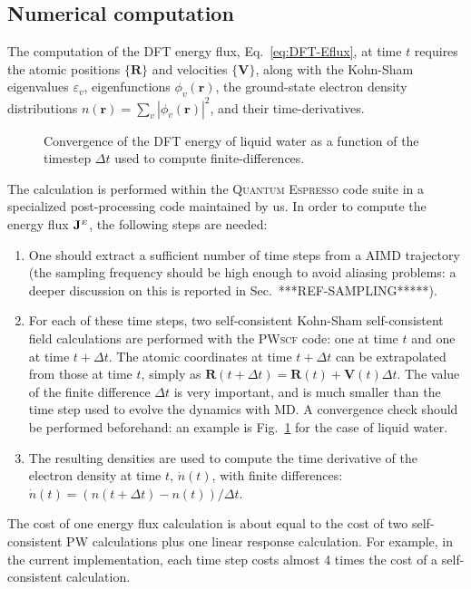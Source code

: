 

\subsection{Numerical computation}
\begin{LEtext}
The computation of the DFT energy flux, Eq.~\eqref{eq:DFT-Eflux}, at time $t$ requires the atomic positions $\{\mathbf{R}\}$ and velocities $\{\mathbf{V}\}$, along with the Kohn-Sham eigenvalues $\varepsilon_v$, eigenfunctions $\phi_v(\mathbf{r})$, the ground-state electron density distributions $n(\mathbf{r}) = \sum_v |\phi_v(\mathbf{r})|^2$, and their time-derivatives. 

\begin{figure}
    \centering
    \caption{Convergence of the DFT energy of liquid water as a function of the timestep $\Delta t$ used to compute finite-differences.}
    \label{fig:dft-curr-timestep-water}
\end{figure}
The calculation is performed within the \textsc{Quantum Espresso} code suite \cite{Giannozzi2009,Giannozzi2017} in a specialized post-processing code maintained by us. 
In order to compute the energy flux $\mathbf{J}^{\scriptscriptstyle E}$, the following steps are needed: 
\begin{enumerate}
    \item One should extract a sufficient number of time steps from a AIMD trajectory (the sampling frequency should be high enough to avoid aliasing problems: a deeper discussion on this is reported in Sec.~***REF-SAMPLING*****). 
    \item For each of these time steps, two self-consistent Kohn-Sham self-consistent field calculations are performed with the \textsc{PWscf} code: one at time $t$ and one at time $t+\Delta t$. The atomic coordinates at time $t+\Delta t$ can be extrapolated from those at time $t$, simply as $\mathbf{R}(t+\Delta t) = \mathbf{R}(t) + \mathbf{V}(t) \Delta t$. The value of the finite difference $\Delta t$ is very important, and is much smaller than the time step used to evolve the dynamics with MD. A convergence check should be performed beforehand: an example is Fig.~\ref{fig:dft-curr-timestep-water} for the case of liquid water.
    \item The resulting densities are used to compute the time derivative of the electron density at time $t$, $\dot{n}(t)$, with finite differences: $\dot{n}(t) = (n(t+\Delta t) - n(t))/\Delta t$.
\end{enumerate}
The cost of one energy flux calculation is about equal to the cost of two self-consistent \textsc{PW} calculations plus one linear response calculation. For example, in the current implementation, each time step costs almost 4 times the cost of a self-consistent calculation.

\end{LEtext}

